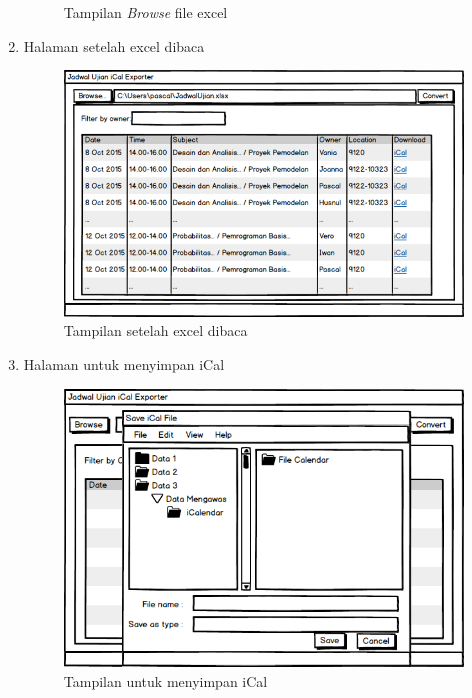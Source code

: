 \begin{enumerate}
\begin{figure}[H]
		\caption{Tampilan \textit{Browse} file excel}
		\label{fig:browse}
		\end{figure}
	\item Halaman setelah excel dibaca
		\begin{figure}[H]
		\centering
		\includegraphics[scale=0.5]{Gambar/antarmuka2}
		\caption{Tampilan setelah excel dibaca}
		\label{fig:excel_dibaca}
		\end{figure}
	\item Halaman untuk menyimpan iCal
		\begin{figure}[H]
		\centering
		\includegraphics[scale=0.5]{Gambar/antarmuka4}
		\caption{Tampilan untuk menyimpan iCal}
		\label{fig:jadwalpng}
		\end{figure}
\end{enumerate}

